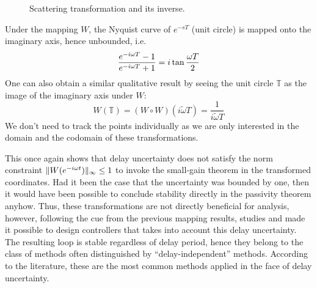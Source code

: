 \begin{figure}%
\centering
{}
\caption[Scattering transformation and its inverse.]{Scattering transformation and its inverse.}%
\label{lit:syn:invscat}%
\end{figure}


Under the mapping $W$, the Nyquist curve of $e^{-sT}$ (unit circle) is mapped onto the imaginary axis, 
hence unbounded, i.e.
\[
\frac{e^{-i\omega T}-1}{e^{-i\omega T}+1} = i\tan{\frac{\omega T}{2}}
\]
One can also obtain a similar qualitative result by seeing the unit circle $\mathbb{T}$ as the image of 
the imaginary axis under $W$: 
\[
W(\mathbb{T}) = (W\circ W)(i\widetilde{\omega} T) = \frac{1}{i\widetilde{\omega} T}
\]
We don't need to track the points individually as we are only interested in the domain and the 
codomain of these transformations. 


This once again shows that delay uncertainty does not satisfy the norm constraint
$\|W(e^{-i\omega t})\|_\infty \leq 1$ to invoke the small-gain theorem in the transformed coordinates. 
Had it been the case that the uncertainty was bounded by one, then it would have been possible to 
conclude stability directly in the passivity theorem anyhow. Thus, these transformations are not directly 
beneficial for analysis, however, following the cue from the previous mapping results, studies 
\cite{andersonspong} and \cite{nieslotine} 
made it possible to design controllers that takes into account this delay uncertainty. The resulting 
loop is stable regardless of delay period, hence they belong to the class of methods often distinguished
by ``delay-independent'' methods. According to the literature, these are the most common methods
applied in the face of delay uncertainty.

